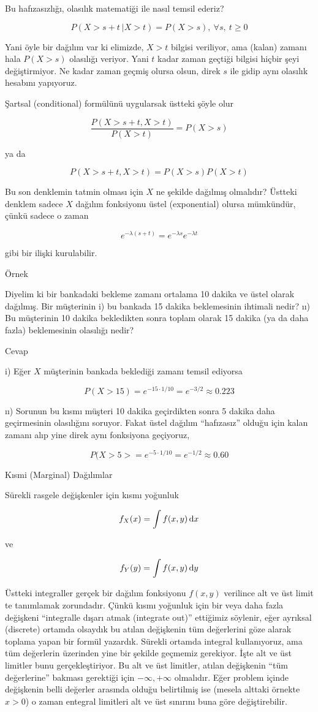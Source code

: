 \documentclass[12pt,fleqn]{article}\usepackage{../../common}
\begin{document}
Bu hafızasızlığı, olasılık matematiği ile nasıl temsil ederiz?

$$ P( X>s+t \ | X>t ) =  P(X>s) , \ \forall s, \ t \ge 0 $$

Yani öyle bir dağılım var ki elimizde, $X>t$ bilgisi veriliyor, ama (kalan)
zamanı hala $P(X>s)$ olasılığı veriyor. Yani $t$ kadar zaman geçtiği 
bilgisi hiçbir şeyi değiştirmiyor. Ne kadar zaman geçmiş olursa olsun,
direk $s$ ile gidip aynı olasılık hesabını yapıyoruz. 

Şartsal (conditional) formülünü uygularsak üstteki şöyle olur

$$  \frac{P( X>s+t,  X>t )}{P(X>t)} = P(X>s)  $$

ya da

$$  P( X>s+t,  X>t ) = P(X>s)P(X>t) $$

Bu son denklemin tatmin olması için $X$ ne şekilde dağılmış olmalıdır?
Üstteki denklem sadece $X$ dağılım fonksiyonu üstel (exponential) olursa
mümkündür, çünkü sadece o zaman

$$ e^{-\lambda(s+t)}  = e^{-\lambda s} e^{-\lambda t}$$

gibi bir ilişki kurulabilir. 

Örnek

Diyelim ki bir bankadaki bekleme zamanı ortalama 10 dakika ve üstel olarak
dağılmış. Bir müşterinin i) bu bankada 15 dakika beklemesinin ihtimali
nedir? ıı) Bu müşterinin 10 dakika bekledikten sonra toplam olarak 15
dakika (ya da daha fazla) beklemesinin olasılığı nedir? 

Cevap

i) Eğer $X$ müşterinin bankada beklediği zamanı temsil ediyorsa

$$ P(X>15) = e^{-15 \cdot 1/10} = e^{-3/2} \approx 0.223 $$

ıı) Sorunun bu kısmı müşteri 10 dakika geçirdikten sonra 5 dakika daha
geçirmesinin olasılığını soruyor. Fakat üstel dağılım ``hafızasız'' olduğu
için kalan zamanı alıp yine direk aynı fonksiyona geçiyoruz, 

$$ P(X>5> = e^{-5 \cdot 1/10} = e^{-1/2} \approx 0.60$$

Kısmi (Marginal) Dağılımlar 

Sürekli rasgele değişkenler için kısmı yoğunluk 

$$ f_X(x) = \int f(x,y) \,\mathrm{d} x $$

ve

$$ f_Y(y) = \int f(x,y) \,\mathrm{d} y $$


Üstteki integraller gerçek bir dağılım fonksiyonu $f(x,y)$ verilince alt ve
üst limit te tanımlamak zorundadır. Çünkü kısmı yoğunluk için bir veya
daha fazla değişkeni ``integralle dışarı atmak (integrate out)'' ettiğimiz
söylenir, eğer ayrıksal (discrete) ortamda olsaydık bu atılan değişkenin
tüm değerlerini göze alarak toplama yapan bir formül yazardık. Sürekli
ortamda integral kullanıyoruz, ama tüm değerlerin üzerinden yine bir
şekilde geçmemiz gerekiyor. İşte alt ve üst limitler bunu
gerçekleştiriyor. Bu alt ve üst limitler, atılan değişkenin ``tüm
değerlerine'' bakması gerektiği için $-\infty,+\infty$ olmalıdır. Eğer
problem içinde değişkenin belli değerler arasında olduğu belirtilmiş ise
(mesela alttaki örnekte $x>0$) o zaman entegral limitleri alt ve üst
sınırını buna göre değiştirebilir. 
\end{document}
